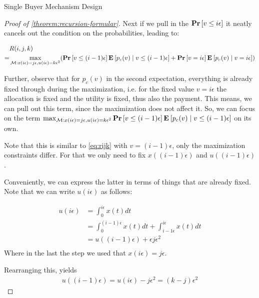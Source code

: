 \documentclass[11pt,a4paper]{article}
\renewcommand{\Pr}[1]{\mbox{\rm\bf Pr}\left[#1\right]}
\newcommand{\Ex}[2][]{\mbox{\rm\bf E}_{#1}\left[#2\right]}
\newcommand{\1}[1]{\mbox{\rm\bf 1}_{#1}}
\begin{document}
\begin{section}{Single Buyer Mechanism Design}
\begin{proof}[Proof of \autoref{theorem:recursion-formular}]
     Next if we pull in the $\Pr{v \leq i\epsilon}$ it neatly cancels out the condition on the probabilities, leading to:

     \begin{align*}
           & R(i,j,k)                                                                                                                                                                                             \\
         = & \max_{\mathcal{M}: x(i\epsilon) = j\epsilon, u(i\epsilon) = k \epsilon^2} (\Pr{v \leq (i-1)\epsilon} \Ex{p_c(v) \mid v \leq (i - 1) \epsilon} + \Pr{v = i \epsilon} \Ex{p_c(v) \mid v = i \epsilon})
     \end{align*}

     Further, observe that for $p_c(v)$ in the second expectation, everything is already fixed through during the maximization, i.e. for the fixed value $v = i \epsilon$ the allocation is fixed and the utility is fixed, thus also the payment.
     This means, we can pull out this term, since the maximization does not affect it.
     So, we can focus on the term $\max_{\mathcal{M}: x(i\epsilon) = j\epsilon, u(i\epsilon)=k\epsilon^2} \Pr{v \leq (i-1)\epsilon} \Ex{p_c(v) \mid v \leq (i - 1) \epsilon}$ on its own.

     Note that this is similar to \autoref{eq:rijk} with $v = (i-1) \epsilon$, only the maximization constraints differ.
     For that we only need to fix $x((i-1)\epsilon)$ and $u((i-1)\epsilon)$.

     Conveniently, we can express the latter in terms of things that are already fixed.
     Note that we can write $u(i\epsilon)$ as follows:

     \begin{align*}
         u(i\epsilon) & = \int_0^{i\epsilon} x(t) dt                                             \\
                      & = \int_0^{(i-1)\epsilon} x(t) dt + \int_{i-1\epsilon}^{i\epsilon} x(t)dt \\
                      & = u((i-1)\epsilon) + \epsilon j \epsilon^2                               \\
     \end{align*}
     Where in the last the step we used that $x(i\epsilon) = j\epsilon$.

     Rearranging this, yields
     \begin{align*}
         u((i-1)\epsilon) = u(i\epsilon) - j \epsilon^2 = (k - j) \epsilon^2
     \end{align*}


\end{proof}
\end{section}
\end{document}
